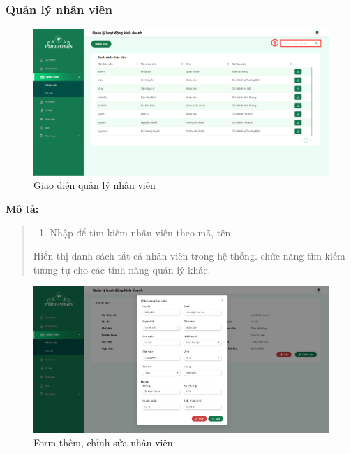 \newpage


\subsubsection{Quản lý nhân viên}
\begin{figure}[!htp]
    \centering
    \includegraphics[width=12cm]{img/UI/admin_implement/staff.png}
    \newline
    \caption{Giao diện quản lý nhân viên}
\end{figure}
\textbf{Mô tả:}
\begin{quote}
    \begin{enumerate}
        \item Nhập để tìm kiếm nhân viên theo mã, tên
    \end{enumerate}
    Hiển thị danh sách tất cả nhân viên trong hệ thống. chức năng tìm kiếm tương tự cho các tính năng quản lý khác.
\end{quote}

\begin{figure}[!htp]
    \centering
    \includegraphics[width=12cm]{img/UI/admin_implement/staffEdit.png}
    \newline
    \caption{Form thêm, chỉnh sửa nhân viên}
\end{figure}


